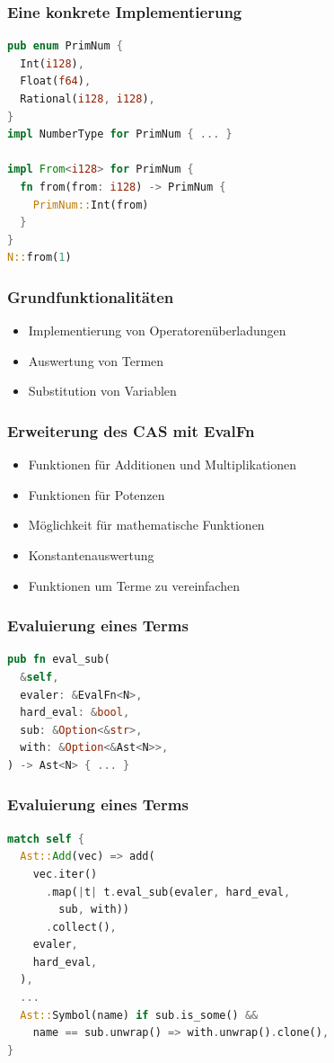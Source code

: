 \documentclass{beamer}
\begin{document}
\begin{frame}[fragile]
  \frametitle{Eine konkrete Implementierung}
  \begin{lstlisting}[language=rust]
pub enum PrimNum {
  Int(i128),
  Float(f64),
  Rational(i128, i128),
}
impl NumberType for PrimNum { ... }

impl From<i128> for PrimNum {
  fn from(from: i128) -> PrimNum {
    PrimNum::Int(from)
  }
}
N::from(1)\end{lstlisting}
\end{frame}

\begin{frame}[fragile]
  \frametitle{Grundfunktionalitäten}
  \begin{itemize}
    \item Implementierung von Operatorenüberladungen
    \pause
    \item Auswertung von Termen
    \pause
    \item Substitution von Variablen
  \end{itemize}
\end{frame}

\begin{frame}[fragile]
  \frametitle{Erweiterung des CAS mit EvalFn}
  \begin{itemize}
    \item Funktionen für Additionen und Multiplikationen
    \pause
    \item Funktionen für Potenzen
    \pause
    \item Möglichkeit für mathematische Funktionen
    \pause
    \item Konstantenauswertung
    \pause
    \item Funktionen um Terme zu vereinfachen
  \end{itemize}
\end{frame}

\begin{frame}[fragile]
  \frametitle{Evaluierung eines Terms}
  \begin{lstlisting}[language=rust]
pub fn eval_sub(
  &self,
  evaler: &EvalFn<N>,
  hard_eval: &bool,
  sub: &Option<&str>,
  with: &Option<&Ast<N>>,
) -> Ast<N> { ... }\end{lstlisting}
\end{frame}

\begin{frame}[fragile]
  \frametitle{Evaluierung eines Terms}
  \begin{lstlisting}[language=rust]
match self {
  Ast::Add(vec) => add(
    vec.iter()
      .map(|t| t.eval_sub(evaler, hard_eval,
        sub, with))
      .collect(),
    evaler,
    hard_eval,
  ),
  ...
  Ast::Symbol(name) if sub.is_some() && 
    name == sub.unwrap() => with.unwrap().clone(),
}\end{lstlisting}
\end{frame}
\end{document}
